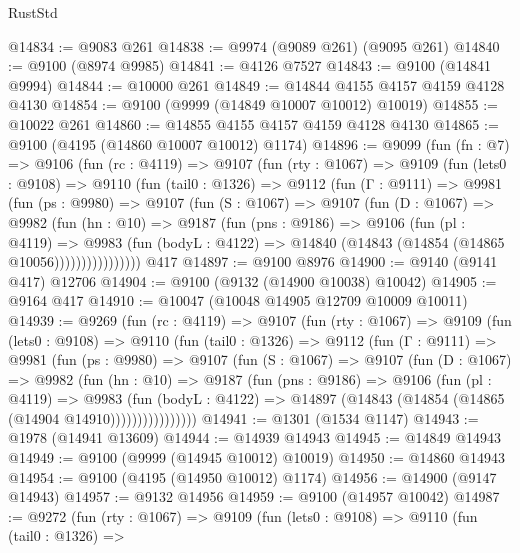 \begin{lexlean}{RustStd}
\begin{coremodule}
@14834 := @9083 @261
@14838 := @9974 (@9089 @261) (@9095 @261)
@14840 := @9100 (@8974 @9985)
@14841 := @4126 @7527
@14843 := @9100 (@14841 @9994)
@14844 := @10000 @261
@14849 := @14844 @4155 @4157 @4159 @4128 @4130
@14854 := @9100 (@9999 (@14849 @10007 @10012) @10019)
@14855 := @10022 @261
@14860 := @14855 @4155 @4157 @4159 @4128 @4130
@14865 := @9100 (@4195 (@14860 @10007 @10012) @1174)
@14896 := @9099
    (fun (fn : @7) =>
    @9106
      (fun (rc : @4119) =>
      @9107
        (fun (rty : @1067) =>
        @9109
          (fun (lets0 : @9108) =>
          @9110
            (fun (tail0 : @1326) =>
            @9112
              (fun (Γ : @9111) =>
              @9981
                (fun (ps : @9980) =>
                @9107
                  (fun (S : @1067) =>
                  @9107
                    (fun (D : @1067) =>
                    @9982
                      (fun (hn : @10) =>
                      @9187
                        (fun (pns : @9186) =>
                        @9106
                          (fun (pl : @4119) =>
                          @9983
                            (fun (bodyL : @4122) =>
                            @14840 (@14843 (@14854 (@14865 @10056))))))))))))))))
    @417
@14897 := @9100 @8976
@14900 := @9140 (@9141 @417) @12706
@14904 := @9100 (@9132 (@14900 @10038) @10042)
@14905 := @9164 @417
@14910 := @10047 (@10048 @14905 @12709 @10009 @10011)
@14939 := @9269
    (fun (rc : @4119) =>
    @9107
      (fun (rty : @1067) =>
      @9109
        (fun (lets0 : @9108) =>
        @9110
          (fun (tail0 : @1326) =>
          @9112
            (fun (Γ : @9111) =>
            @9981
              (fun (ps : @9980) =>
              @9107
                (fun (S : @1067) =>
                @9107
                  (fun (D : @1067) =>
                  @9982
                    (fun (hn : @10) =>
                    @9187
                      (fun (pns : @9186) =>
                      @9106
                        (fun (pl : @4119) =>
                        @9983
                          (fun (bodyL : @4122) =>
                          @14897 (@14843 (@14854 (@14865 (@14904 @14910))))))))))))))))
@14941 := @1301 (@1534 @1147)
@14943 := @1978 (@14941 @13609)
@14944 := @14939 @14943
@14945 := @14849 @14943
@14949 := @9100 (@9999 (@14945 @10012) @10019)
@14950 := @14860 @14943
@14954 := @9100 (@4195 (@14950 @10012) @1174)
@14956 := @14900 (@9147 @14943)
@14957 := @9132 @14956
@14959 := @9100 (@14957 @10042)
@14987 := @9272
    (fun (rty : @1067) =>
    @9109
      (fun (lets0 : @9108) =>
      @9110
        (fun (tail0 : @1326) =>

\end{coremodule}
\end{lexlean}
